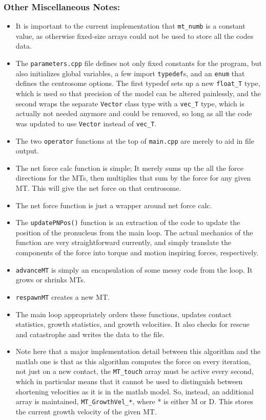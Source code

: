 \documentclass{article}
\begin{document}
\subsubsection{Other Miscellaneous Notes:}
\begin{itemize}
  \item It is important to the current implementation that \texttt{mt\_numb} is
    a constant value, as otherwise fixed-size arrays could not be used to store
    all the codes data. 
  \item The \texttt{parameters.cpp} file defines not only fixed constants for
    the program, but also initializes global variables, a few  import
    \texttt{typedef}s, and an \texttt{enum} that defines the centrosome options.
    The first typedef sets up a new \texttt{float\_T} type, which is used so
    that precision of the model can be altered painlessly, and the second wraps
    the separate \texttt{Vector} class type with a \texttt{vec\_T} type, which
    is actually not needed anymore and could be removed, so long as all the code
    was updated to use \texttt{Vector} instead of \texttt{vec\_T}. 
  \item The two \texttt{operator} functions at the top of \texttt{main.cpp} are
    merely to aid in file output. 
  \item The net force calc function is simple; It merely sums up the all the force
    directions for the MTs, then multiplies that sum by the force for any given
    MT. This will give the net force on that centrosome. 
  \item The net force function is just a wrapper around net force calc. 
  \item The \texttt{updatePNPos()} function is an extraction of the code to
    update the position of the pronucleus from the main loop. The
    actual mechanics of the function are very straightforward currently, and
    simply translate the components of the force into torque and motion
    inspiring forces, respectively. 
  \item \texttt{advanceMT} is simply an encapsulation of some messy code from
    the loop. It grows or shrinks MTs. 
  \item \texttt{respawnMT} creates a new MT. 
  \item The main loop appropriately orders these functions, updates contact
    statistics, growth statistics, and growth velocities. It also checks for
    rescue and catastrophe and writes the data to the file. 
  \item Note here that a major implementation detail between this algorithm and
    the matlab one is that as this algorithm computes the force on every
    iteration, not just on a new contact, the \texttt{MT\_touch} array must be
    active every second, which in particular means that it cannot be used to
    distinguish between shortening velocities as it is in the matlab model. So,
    instead, an additional array is maintained, \texttt{MT\_GrowthVel\_*}, where
    * is either M or D. This stores the current growth velocity of the given MT. 
\end{itemize}
\end{document}
